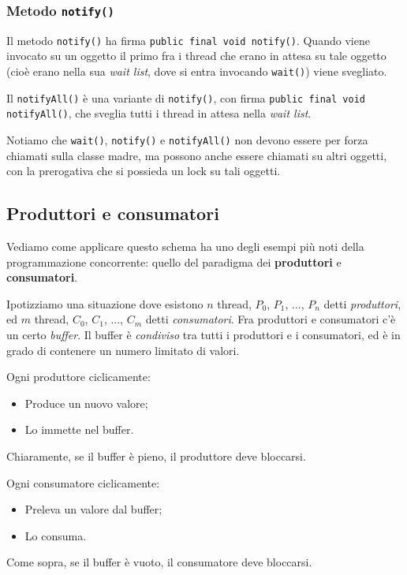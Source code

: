 \documentclass[a4paper,11pt]{article}
\begin{document}
\subsubsection{Metodo \lstinline|notify()|}
Il metodo \lstinline|notify()| ha firma \lstinline|public final void notify()|. Quando viene invocato su un oggetto il primo fra i thread che erano in attesa su tale oggetto (cioè erano nella sua \textit{wait list}, dove si entra invocando \lstinline|wait()|) viene svegliato.

Il \lstinline|notifyAll()| è una variante di \lstinline|notify()|, con firma \lstinline|public final void notifyAll()|, che sveglia tutti i thread in attesa nella \textit{wait list}.

\par\medskip

Notiamo che \lstinline|wait()|, \lstinline|notify()| e \lstinline|notifyAll()| non devono essere per forza chiamati sulla classe madre, ma possono anche essere chiamati su altri oggetti, con la prerogativa che si possieda un lock su tali oggetti.

\subsection{Produttori e consumatori}
Vediamo come applicare questo schema ha uno degli esempi più noti della programmazione concorrente: quello del paradigma dei \textbf{produttori} e  \textbf{consumatori}.

Ipotizziamo una situazione dove esistono $n$ thread, $P_0$, $P_1$, ..., $P_n$ detti \textit{produttori}, ed $m$ thread, $C_0$, $C_1$, ..., $C_m$ detti \textit{consumatori}.
Fra produttori e consumatori c'è un certo \textit{buffer}. Il buffer è \textit{condiviso} tra tutti i produttori e i consumatori, ed è in grado di contenere un numero limitato di valori.

Ogni produttore ciclicamente:
\begin{itemize}
	\item Produce un nuovo valore;
	\item Lo immette nel buffer.
\end{itemize}
Chiaramente, se il buffer è pieno, il produttore deve bloccarsi.

Ogni consumatore ciclicamente:
\begin{itemize}
	\item Preleva un valore dal buffer;
	\item Lo consuma.
\end{itemize}
Come sopra, se il buffer è vuoto, il consumatore deve bloccarsi.
\end{document}
